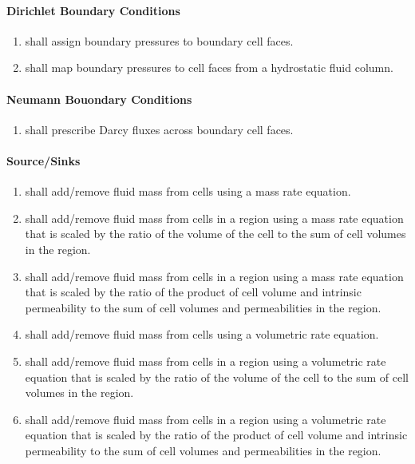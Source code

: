 \paragraph{Dirichlet Boundary Conditions}
\begin{enumerate}[resume]
	\item \label{fluidDirichletBC} \pft shall assign boundary pressures to boundary cell faces. 
	\item \label{fluidHydrostaticBC} \pft shall map boundary pressures to cell faces from a hydrostatic fluid column.
	\hydrostatictext
\end{enumerate}

\paragraph{Neumann Bouondary Conditions}
\begin{enumerate}[resume]
	\item \label{fluidNeumannBC} \pft shall prescribe Darcy fluxes across boundary cell faces.

\end{enumerate}

\paragraph{Source/Sinks}
\begin{enumerate}[label=FR \arabic*.,ref=FR \arabic*,nosep, resume]
	\item \label{fluidMassRateSS} \pft shall add/remove fluid mass from cells using a mass rate equation.
	\item \label{fluidScaledMassRateVolSS} \pft shall add/remove fluid mass from cells in a region using a mass rate equation that is scaled by the ratio of the volume of the cell to the sum of cell volumes in the region.
	\item \label{fluidScaledMassRatePermSS} \pft shall add/remove fluid mass from cells in a region using a mass rate equation that is scaled by the ratio of the product of cell volume and intrinsic permeability to the sum of cell volumes and permeabilities in the region.
	\item \label{fluidVolRateSS} \pft shall add/remove fluid mass from cells using a volumetric rate equation.
	\item \label{scaledVolRateVol} \pft shall add/remove fluid mass from cells in a region using a volumetric rate equation that is scaled by the ratio of the volume of the cell to the sum of cell volumes in the region.
	\item \label{fluidScaledVolRatePermSS} \pft shall add/remove fluid mass from cells in a region using a volumetric rate equation that is scaled by the ratio of the product of cell volume and intrinsic permeability to the sum of cell volumes and permeabilities in the region.
\end{enumerate}

